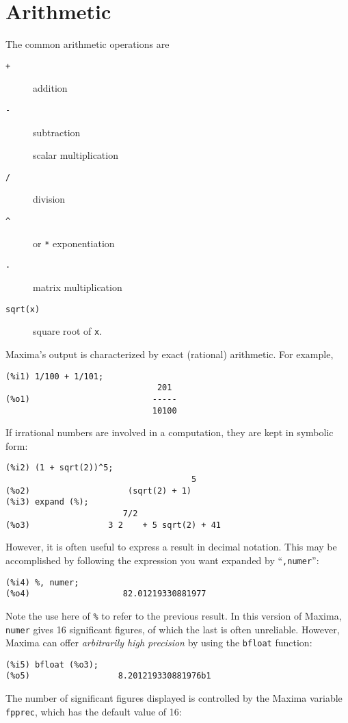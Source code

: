 \documentclass[a4paper,12pt]{article}
\begin{document}
\section{Arithmetic \label{sec:arithmetic}}

The common arithmetic operations are
\begin{description}
   \item [{\tt +}] addition
   \item [{\tt -}] subtraction
   \item [{\tt *}] scalar multiplication
   \item [{\tt /}] division
   \item [{\tt \^}]  or {\tt **} exponentiation
   \item [{\tt .}] matrix multiplication
   \item [{\tt sqrt(x)}] square root of {\tt x}.
\end{description}
Maxima's output is characterized by exact (rational) arithmetic. For example,
\begin{verbatim}
(%i1) 1/100 + 1/101;
                               201
(%o1)                         -----
                              10100
\end{verbatim}
If irrational numbers are involved in a computation, they are kept in symbolic form:
\begin{verbatim}
(%i2) (1 + sqrt(2))^5;
                                      5
(%o2)                    (sqrt(2) + 1)
(%i3) expand (%);
                        7/2
(%o3)                3 2    + 5 sqrt(2) + 41
\end{verbatim}
However, it is often useful to express a result in decimal notation.
This may be accomplished by following the expression you want expanded
by ``{\tt ,numer}'':
\begin{verbatim}
(%i4) %, numer;
(%o4)                   82.01219330881977
\end{verbatim}
Note the use here of \verb+%+
to refer to the previous result.  In this version of Maxima, {\tt
  numer} gives 16 significant figures, of which the last is often
unreliable.  However, Maxima can offer \emph{arbitrarily high
  precision} by using the {\tt bfloat} function:
\begin{verbatim}
(%i5) bfloat (%o3);
(%o5)                  8.201219330881976b1
\end{verbatim}
The number of significant figures displayed is controlled by the
Maxima variable {\tt fpprec}, which has the default value of 16:
\end{document}
